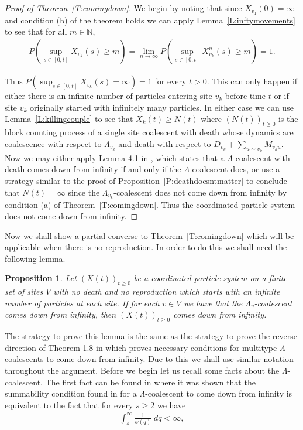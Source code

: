 \documentclass[11pt]{article}
\newtheorem{proposition}{Proposition}
\theoremstyle{definition}
\newcommand{\N}{\mathbb{N}}
\newcommand{\thmref}[1]{Theorem~\ref{T:#1}}
\newcommand{\lemref}[1]{Lemma~\ref{L:#1}}
\newcommand{\propref}[1]{Proposition~\ref{P:#1}}
\begin{document}
\begin{proof}[Proof of \thmref{comingdown}]
    We begin by noting that since $X_{v_1}(0) = \infty$ and condition (b) of the theorem holds we can apply \lemref{inftymovements} to see that for all $m \in \N$,
    \begin{align*}
        P\left(\sup_{s \in [0,t]} X_{v_k}(s) \geq m\right) = \lim_{n \to \infty}P\left(\sup_{s \in [0,t]} X_{v_k}^n(s) \geq m\right) = 1.
    \end{align*}

    \noindent Thus $P(\sup_{s \in [0,t]} X_{v_k}(s) = \infty) = 1$ for every $t > 0$. This can only happen if either there is an infinite number of particles entering site $v_k$ before time $t$ or if site $v_k$ originally started with infinitely many particles. In either case we can use \lemref{killingcouple} to see that $X_k(t) \geq N(t)$ where $(N(t))_{t \geq 0}$ is the block counting process of a single site coalescent with death whose dynamics are coalescence with respect to $\Lambda_{v_k}$ and death with respect to $D_{v_k} + \sum_{u \sim v_k} M_{v_ku}$. Now we may either apply Lemma 4.1 in \cite{Johnston2023}, which states that a $\Lambda$-coalescent with death comes down from infinity if and only if the $\Lambda$-coalescent does, or use a strategy similar to the proof of \propref{deathdoesntmatter} to conclude that $N(t) = \infty$ since the $\Lambda_{v_k}$-coalescent does not come down from infinity by condition (a) of \thmref{comingdown}. Thus the coordinated particle system does not come down from infinity. 
\end{proof}

\noindent Now we shall show a partial converse to \thmref{comingdown} which will be applicable when there is no reproduction. In order to do this we shall need the following lemma.

\begin{proposition}\label{P:comedown}
    Let $(X(t))_{t \geq 0}$ be a coordinated particle system on a finite set of sites $V$ with no death and no reproduction which starts with an infinite number of particles at each site. If for each $v \in V$ we have that the $\Lambda_v$-coalescent comes down from infinity, then $(X(t))_{t \geq 0}$ comes down from infinity.
\end{proposition}

\noindent The strategy to prove this lemma is the same as the strategy to prove the reverse direction of Theorem 1.8 in \cite{Johnston2023} which proves necessary conditions for multitype $\Lambda$-coalescents to come down from infinity. Due to this we shall use similar notation throughout the argument. Before we begin let us recall some facts about the $\Lambda$-coalescent. The first fact can be found in \cite{stochasticflows3} where it was shown that the summability condition found in \cite{lamdacomedown} for a $\Lambda$-coalescent to come down from infinity is equivalent to the fact that for every $s \geq 2$ we have
%
\begin{align*}
    \int_s^\infty \frac{1}{\psi(q)}\;dq < \infty,
\end{align*}
\end{document}

